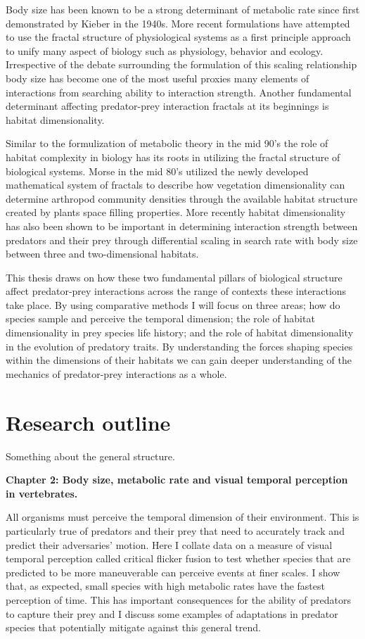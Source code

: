 Body size has been known to be a strong determinant of metabolic rate since first demonstrated by Kieber in the 1940s. More recent formulations have attempted to use the fractal structure of physiological systems as a first principle approach to unify many aspect of biology such as physiology, behavior and ecology. Irrespective of the debate surrounding the formulation of this scaling relationship body size has become one of the most useful proxies many elements of interactions from searching ability to interaction strength. Another fundamental determinant affecting predator-prey interaction fractals at its beginnings is habitat dimensionality.


Similar to the formulization of metabolic theory in the mid 90's the role of habitat complexity in biology has its roots in utilizing the fractal structure of biological systems. Morse in the mid 80's utilized the newly developed mathematical system of fractals to describe how vegetation dimensionality can determine arthropod community densities through the available habitat structure created by plants space filling properties. More recently habitat dimensionality has also been shown to be important in determining interaction strength between predators and their prey through differential scaling in search rate with body size between three and two-dimensional habitats. 


This thesis draws on how these two fundamental pillars of biological structure affect predator-prey interactions across the range of contexts these interactions take place. By using comparative methods I will focus on three areas; how do species sample and perceive the temporal dimension; the role of habitat dimensionality in prey species life history; and the role of habitat dimensionality in the evolution of predatory traits. By understanding the forces shaping species within the dimensions of their habitats we can gain deeper understanding of the mechanics of predator-prey interactions as a whole.


\section{\uppercase{R}esearch outline}
Something about the general structure.


\textbf{Chapter 2: Body size, metabolic rate and visual temporal perception in vertebrates.}

 All organisms must perceive the temporal dimension of their environment. This is particularly true of predators and their prey that need to accurately track and predict their adversaries' motion. Here I collate data on a measure of visual temporal perception called critical flicker fusion to test whether species that are predicted to be more maneuverable can perceive events at finer scales. I show that, as expected, small species with high metabolic rates have the fastest perception of time. This has important consequences for the ability of predators to capture their prey and I discuss some examples of adaptations in predator species that potentially mitigate against this general trend. 


